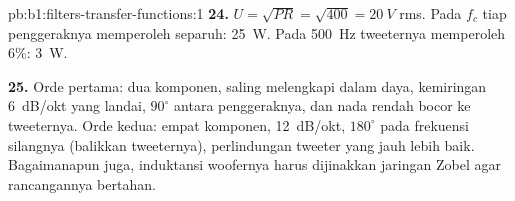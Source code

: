 \begin{solution}{pb:b1:filters-transfer-functions:1}
\textbf{24.} $U = \sqrt{PR} = \sqrt{400} = \qty{20}{V}$ rms. Pada $f_c$ tiap
penggeraknya memperoleh separuh: \qty{25}{W}. Pada \qty{500}{Hz} tweeternya
memperoleh $6\%$: \qty{3}{W}.

\textbf{25.} Orde pertama: dua komponen, saling melengkapi dalam daya,
kemiringan \qty{6}{dB/okt} yang landai, $90^\circ$ antara penggeraknya,
dan nada rendah bocor ke tweeternya. Orde kedua: empat komponen,
\qty{12}{dB/okt}, $180^\circ$ pada frekuensi silangnya (balikkan
tweeternya), perlindungan tweeter yang jauh lebih baik. Bagaimanapun
juga, induktansi woofernya harus dijinakkan jaringan Zobel agar
rancangannya bertahan.
\end{solution}
